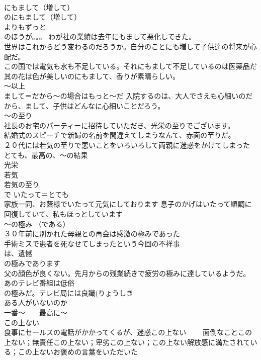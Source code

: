 \documentclass[8pt]{extreport}
\begin{document}
\begin{CJK}{UTF8}{min}
\\	にもまして（増して） 
\\	のにもまして（増して）	
\\	よりもずっと
\\	のほうが。。。	わが社の業績は去年にもまして悪化してきた。 
\\	世界はこれからどう変わるのだろうか。自分のことにも増して子供達の将来が心配だ。 
\\	この国では電気も水も不足している。それにもまして不足しているのは医薬品だ 
\\	其の花は色が美しいのにもまして、香りが素晴らしい。 
\\	～以上 
\\	まして＝だから～の場合はもっと～だ 入院するのは、大人でさえも心細いのだから、まして、子供はどんなに心細いことだろう。 
\\	～の至り	
\\	社長のお宅のパーティーに招待していただき、光栄の至りでございます。 
\\	結婚式のスピーチで新婦の名前を間違えてしまうなんて、赤面の至りだ。
\\	２０代には若気の至りで悪いことをいろいろして両親に迷惑をかけてしまった	とても、最高の、～の結果 
\\	光栄 
\\	若気 
\\	若気の至り 
\\	で いたって＝とても 
\\	家族一同、お蔭様でいたって元気にしております 息子のかげはいたって順調に回復していて、私もほっとしています
\\	～の極み （である）	
\\	３０年前に別かれた母親との再会は感激の極みであった 
\\	手術ミスで患者を死なせてしまったという今回の不祥事
\\	は、遺憾
\\	の極みであります 
\\	父の顔色が良くない。先月からの残業続きで疲労の極みに達しているようだ。 あのテレビ番組は低俗
\\	の極みだ。テレビ局には良識(りょうしき 
\\	ある人がいないのか 
\\	一番～　　最高に～	
\\	この上ない　
\\	食事にセールスの電話がかかってくるが、迷惑この上ない 　　面倒なことこの上ない；無責任この上ない；卑劣この上ない；この上ない解放感に満たされている；この上ないお褒めの言葉をいただいた 

\end{CJK}
\end{document}
